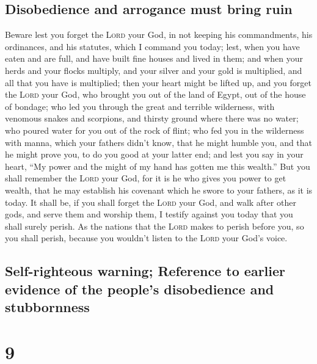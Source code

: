 \hypertarget{disobedience-and-arrogance-must-bring-ruin}{%
\subsection{Disobedience and arrogance must bring
ruin}\label{disobedience-and-arrogance-must-bring-ruin}}

 Beware lest you forget the \textsc{Lord} your God, in
not keeping his commandments, his ordinances, and his statutes, which I
command you today;  lest, when you have eaten and are
full, and have built fine houses and lived in them;  and
when your herds and your flocks multiply, and your silver and your gold
is multiplied, and all that you have is multiplied;  then
your heart might be lifted up, and you forget the \textsc{Lord} your
God, who brought you out of the land of Egypt, out of the house of
bondage;  who led you through the great and terrible
wilderness, with venomous snakes and scorpions, and thirsty ground where
there was no water; who poured water for you out of the rock of flint;
 who fed you in the wilderness with manna, which your
fathers didn't know, that he might humble you, and that he might prove
you, to do you good at your latter end;  and lest you say
in your heart, ``My power and the might of my hand has gotten me this
wealth.''  But you shall remember the \textsc{Lord} your
God, for it is he who gives you power to get wealth, that he may
establish his covenant which he swore to your fathers, as it is today.
 It shall be, if you shall forget the \textsc{Lord} your
God, and walk after other gods, and serve them and worship them, I
testify against you today that you shall surely perish. 
As the nations that the \textsc{Lord} makes to perish before you, so you
shall perish, because you wouldn't listen to the \textsc{Lord} your
God's voice.

\hypertarget{self-righteous-warning-reference-to-earlier-evidence-of-the-peoples-disobedience-and-stubbornness}{%
\subsection{Self-righteous warning; Reference to earlier evidence of the
people's disobedience and
stubbornness}\label{self-righteous-warning-reference-to-earlier-evidence-of-the-peoples-disobedience-and-stubbornness}}

\hypertarget{section-8}{%
\section{9}\label{section-8}}

